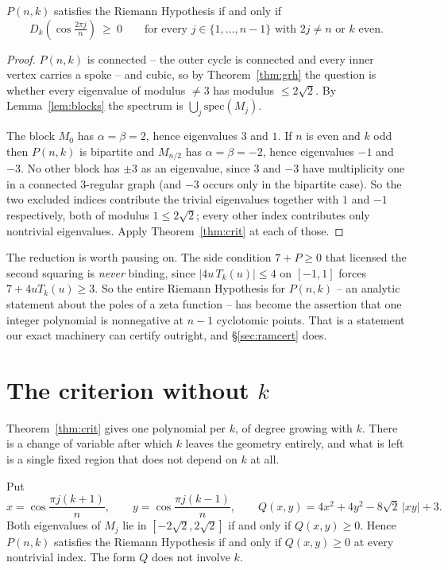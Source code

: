 \begin{corollary}\label{cor:crit}
$P(n,k)$ satisfies the Riemann Hypothesis if and only if
\[
  D_k\!\left(\cos\tfrac{2\pi j}{n}\right)\ \ge\ 0
  \qquad\text{for every }j\in\{1,\dots,n-1\}\text{ with }2j\ne n\text{ or }k
  \text{ even.}
\]
\end{corollary}

\begin{proof}
$P(n,k)$ is connected -- the outer cycle is connected and every inner vertex
carries a spoke -- and cubic, so by Theorem~\ref{thm:grh} the question is
whether every eigenvalue of modulus $\ne3$ has modulus $\le2\sqrt2$. By
Lemma~\ref{lem:blocks} the spectrum is $\bigcup_j\mathrm{spec}(M_j)$.

The block $M_0$ has $\alpha=\beta=2$, hence eigenvalues $3$ and $1$. If $n$ is
even and $k$ odd then $P(n,k)$ is bipartite and $M_{n/2}$ has
$\alpha=\beta=-2$, hence eigenvalues $-1$ and $-3$. No other block has $\pm3$
as an eigenvalue, since $3$ and $-3$ have multiplicity one in a connected
$3$-regular graph (and $-3$ occurs only in the bipartite case). So the two
excluded indices contribute the trivial eigenvalues together with $1$ and $-1$
respectively, both of modulus $1\le2\sqrt2$; every other index contributes only
nontrivial eigenvalues. Apply Theorem~\ref{thm:crit} at each of those.
\end{proof}

The reduction is worth pausing on. The side condition $7+P\ge0$ that licensed
the second squaring is \emph{never} binding, since $|4u\,T_k(u)|\le4$ on
$[-1,1]$ forces $7+4uT_k(u)\ge3$. So the entire Riemann Hypothesis for
$P(n,k)$ -- an analytic statement about the poles of a zeta function -- has
become the assertion that one integer polynomial is nonnegative at $n-1$
cyclotomic points. That is a statement our exact machinery can certify
outright, and \S\ref{sec:ramcert} does.

\section{The criterion without \texorpdfstring{$k$}{k}}\label{sec:corner}

Theorem~\ref{thm:crit} gives one polynomial per $k$, of degree growing with
$k$. There is a change of variable after which $k$ leaves the geometry
entirely, and what is left is a single fixed region that does not depend on
$k$ at all.

\begin{theorem}\label{thm:corner}
Put
\[
  x=\cos\frac{\pi j(k+1)}{n},\qquad
  y=\cos\frac{\pi j(k-1)}{n},\qquad
  Q(x,y)=4x^{2}+4y^{2}-8\sqrt2\,|xy|+3 .
\]
Both eigenvalues of $M_j$ lie in $[-2\sqrt2,2\sqrt2]$ if and only if
$Q(x,y)\ge0$. Hence $P(n,k)$ satisfies the Riemann Hypothesis if and only if
$Q(x,y)\ge0$ at every nontrivial index. The form $Q$ does not involve $k$.
\end{theorem}

